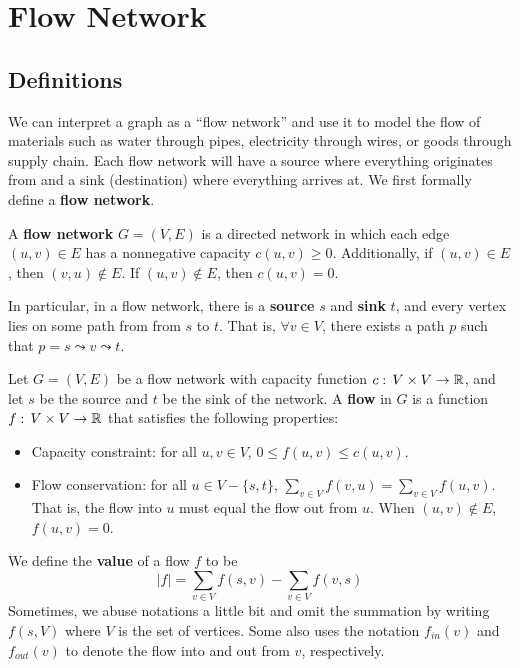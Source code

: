 \section{Flow Network}

\subsection{Definitions}

We can interpret a graph as a ``flow network'' and use it to model the flow of materials such as water through pipes, electricity through wires, or goods through supply chain. Each flow network will have a source where everything originates from and a sink (destination) where everything arrives at. We first formally define a \textbf{flow network}.

\begin{definition}   
    A \textbf{flow network} $G=(V,E)$ is a directed network in which each edge $(u,v) \in E$ has a nonnegative capacity $c(u,v) \geq 0$. Additionally, if $(u,v) \in E$, then $(v,u) \not\in E$. If $(u,v) \not\in E$, then $c(u,v) = 0$.

    In particular, in a flow network, there is a \textbf{source} $s$ and \textbf{sink} $t$, and every vertex lies on some path from from $s$ to $t$. That is, $\forall v \in V$, there exists a path $p$ such that $p = s \leadsto v \leadsto t$.
\end{definition}

\begin{definition}[Flow] 
    Let $G=(V,E)$ be a flow network with capacity function $c:\, V\times V \to \mathbb{R}$, and let $s$ be the source and $t$ be the sink of the network. A \textbf{flow} in $G$ is a function $f:\, V\times V \to \mathbb{R}$ that satisfies the following properties:
    \begin{itemize}
        \item Capacity constraint: for all $u,v \in V$, $0 \leq f(u,v) \leq c(u,v)$.
        \item Flow conservation: for all $u \in V - \{s,t\}$, $\sum_{v \in V} f(v,u) = \sum_{v \in V} f(u,v)$. That is, the flow into $u$ must equal the flow out from $u$. When $(u,v) \not\in E$, $f(u,v) = 0$.
    \end{itemize}
    We define the \textbf{value} of a flow $f$ to be
    $$
    |f| = \sum_{v\in V} f(s,v) - \sum_{v \in V} f(v,s)
    $$
    Sometimes, we abuse notations a little bit and omit the summation by writing $f(s,V)$ where $V$ is the set of vertices. Some also uses the notation $f_{in}(v)$ and $f_{out}(v)$ to denote the flow into and out from $v$, respectively.
\end{definition}


